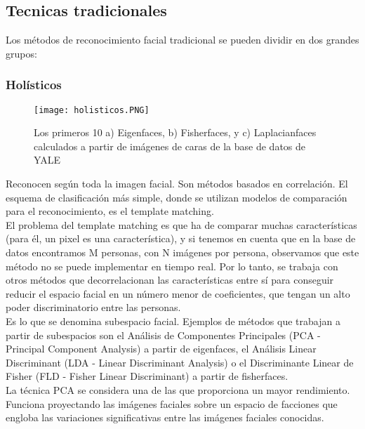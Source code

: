 \documentclass[a4paper,11pt]{article}
\begin{document}
 
\subsection{Tecnicas tradicionales}

	Los métodos de reconocimiento facial tradicional se pueden dividir en dos grandes grupos:
	
	\subsubsection{Holísticos}
	
 	\begin{figure}[h]
 		\centering
 		\texttt{[image: holisticos.PNG]}
 		\caption{Los primeros 10 a) Eigenfaces, b) Fisherfaces, y c) Laplacianfaces calculados a partir de imágenes de caras de la base de datos de YALE}
 		\label{fig:Holisticos}
 	\end{figure}
	Reconocen según toda la imagen facial. Son métodos basados en correlación. El esquema de clasificación más simple, donde se utilizan modelos de comparación para el reconocimiento, es el template matching. \\ 
	
	El problema del template matching es que ha de comparar muchas características (para él, un pixel es una característica), y si tenemos en cuenta que en la base de datos encontramos M personas, con N imágenes por persona, observamos que este método no se puede implementar en tiempo real. Por lo tanto, se trabaja con otros métodos que decorrelacionan las características entre sí para conseguir reducir el espacio facial en un número menor de coeficientes, que tengan un alto poder discriminatorio entre las personas. \\
	
	Es lo que se denomina subespacio facial. Ejemplos de métodos que trabajan a partir de subespacios son el Análisis de Componentes Principales (PCA - Principal Component Analysis) a partir de eigenfaces, el Análisis Linear Discriminant (LDA - Linear Discriminant Analysis) o el Discriminante Linear de Fisher (FLD - Fisher Linear Discriminant) a partir de fisherfaces.\\
	
	La técnica PCA se considera una de las que proporciona un mayor rendimiento. Funciona proyectando las imágenes faciales sobre un espacio de facciones que engloba las variaciones significativas entre las imágenes faciales conocidas.\\
	
\end{document}
